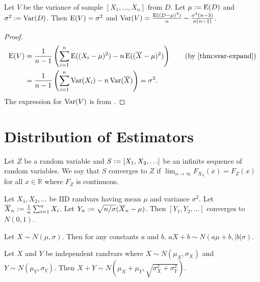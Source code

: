 \documentclass[a4paper, 12pt, fleqn]{article}
\begin{document}
\begin{theorem}
Let $V$ be the variance of sample $[X_1, \ldots, X_n]$ from $D$.
Let $\mu := \operatorname*{E}(D)$ and $\sigma^2 := \operatorname*{Var}(D)$.
Then $\operatorname*{E}(V) = \sigma^2$ and
$\operatorname*{Var}(V) = \frac{\operatorname*{E}((D-\mu)^4)}{n} - \frac{\sigma^4(n-3)}{n(n-1)}$.
\end{theorem}
\begin{proof}
\begin{align*}
\E(V) &= \frac{1}{n-1}\left(\sum_{i=1}^n \E((X_i-\mu)^2) - n\E((\Xbar-\mu)^2)\right)
    \tag{by \cref{thm:svar-expand}}
\\ &= \frac{1}{n-1}\left(\sum_{i=1}^n \Var(X_i) - n\Var(\Xbar)\right) = \sigma^2.
\end{align*}
The expression for $\operatorname*{Var}(V)$ is from \cite{se.math.73080}.
\end{proof}

\section{Distribution of Estimators}

\begin{definition}
Let $Z$ be a random variable and $S := [X_1, X_2, \ldots]$ be an infinite sequence
of random variables. We say that $S$ converges to $Z$ if
$\lim_{n \to \infty} F_{X_n}(x) = F_Z(x)$ for all $x \in \mathbb{R}$ where $F_Z$ is continuous.
\end{definition}

\begin{theorem}
Let $X_1, X_2, \ldots$ be IID randvars having mean $\mu$ and variance $\sigma^2$.
Let $\overline{X}_n := \frac{1}{n}\sum_{i=1}^n X_i$.
Let $Y_n := \sqrt{n/\sigma}(\overline{X}_n - \mu)$.
Then $[Y_1, Y_2, \ldots]$ converges to $N(0, 1)$.
\end{theorem}

\begin{lemma}
\label{thm:scaling-normal}
Let $X \sim N(\mu, \sigma)$. Then for any constants $a$ and $b$,
$aX + b \sim N(a\mu + b, |b|\sigma)$.
\end{lemma}

\begin{lemma}
\label{thm:sum-of-ind-normal}
Let $X$ and $Y$ be independent randvars where
$X \sim N(\mu_X, \sigma_X)$ and $Y \sim N(\mu_Y, \sigma_Y)$.
Then $X + Y \sim N(\mu_X + \mu_Y, \sqrt{\sigma_X^2 + \sigma_Y^2})$.
\end{lemma}
\end{document}
